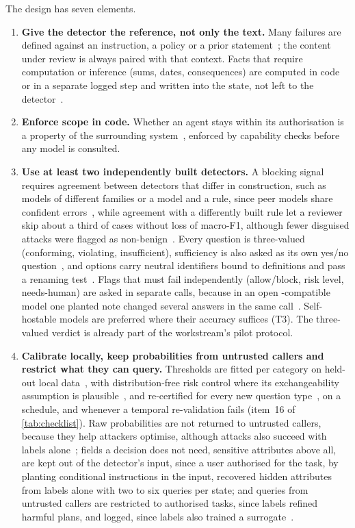 The design has seven elements.
\begin{enumerate}
  \item \textbf{Give the detector the reference, not only the text.} Many failures are defined against an instruction, a policy or a prior statement~\cite{arx29429}; the content under review is always paired with that context. Facts that require computation or inference (sums, dates, consequences) are computed in code or in a separate logged step and written into the state, not left to the detector~\cite{arx39496,arx01834}.
  \item \textbf{Enforce scope in code.} Whether an agent stays within its authorisation is a property of the surrounding system~\cite{arx22664}, enforced by capability checks before any model is consulted.
  \item \textbf{Use at least two independently built detectors.} A blocking signal requires agreement between detectors that differ in construction, such as models of different families or a model and a rule, since peer models share confident errors~\cite{arx29769}, while agreement with a differently built rule let a reviewer skip about a third of cases without loss of macro-F1, although fewer disguised attacks were flagged as non-benign~\cite{arx02048}. Every question is three-valued (conforming, violating, insufficient), sufficiency is also asked as its own yes/no question~\cite{arx01006}, and options carry neutral identifiers bound to definitions and pass a renaming test~\cite{arx26758,arx00346}. Flags that must fail independently (allow/block, risk level, needs-human) are asked in separate calls, because in an open \jev{}-compatible model one planted note changed several answers in the same call~\cite{zen23038928}\zmark{}. Self-hostable models are preferred where their accuracy suffices (T3). The three-valued verdict is already part of the workstream's pilot protocol.
  \item \textbf{Calibrate locally, keep probabilities from untrusted callers and restrict what they can query.} Thresholds are fitted per category on held-out local data~\cite{arx29429,arx24052,jkf87_2026replication}, with distribution-free risk control where its exchangeability assumption is plausible~\cite{bates2021distribution,angelopoulos2024conformal}, and re-certified for every new question type~\cite{arx33689}, on a schedule, and whenever a temporal re-validation fails (item~16 of \cref{tab:checklist}). Raw probabilities are not returned to untrusted callers, because they help attackers optimise, although attacks also succeed with labels alone~\cite{arx30243,arx28613}; fields a decision does not need, sensitive attributes above all, are kept out of the detector's input, since a user authorised for the task, by planting conditional instructions in the input, recovered hidden attributes from labels alone with two to six queries per state; and queries from untrusted callers are restricted to authorised tasks, since labels refined harmful plans, and logged, since labels also trained a surrogate~\cite{arx04985}.

\end{enumerate}
